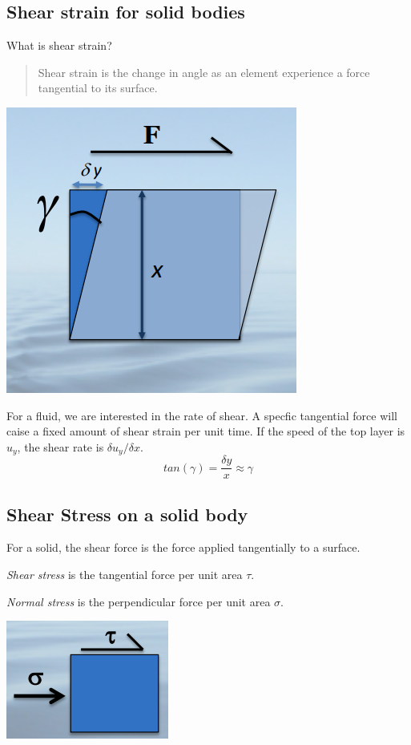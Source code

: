 \documentclass[class=report, crop=false, 12pt,a4paper]{standalone}
\begin{document}
\subsection{Shear strain for solid bodies}
What is shear strain?
\begin{quote}
  \begin{center}
    Shear strain is the change in angle as an element experience a force tangential to its surface.
  \end{center}
\end{quote}
\begin{center}
  \includegraphics[width = 0.4 \textwidth]{../img/ShearStrainDiagram}
\end{center}
For a fluid, we are interested in the rate of shear. A specfic tangential force will caise a fixed amount of shear strain per unit time. If the speed of the top layer is \( u_y\), the shear rate is \(\delta u_y / \delta x\).
\begin{equation}
  tan(\gamma) = \frac{\delta y}{x} \approx \gamma
\end{equation}

\subsection{Shear Stress on a solid body}
For a solid, the shear force is the force applied tangentially to a surface.

\emph{Shear stress} is the tangential force per unit area \( \tau\).

\emph{Normal stress} is the perpendicular force per unit area \( \sigma \).

\begin{center}
  \includegraphics[width = 0.4 \textwidth]{../img/ShearForceDiagram}
\end{center}
\end{document}
